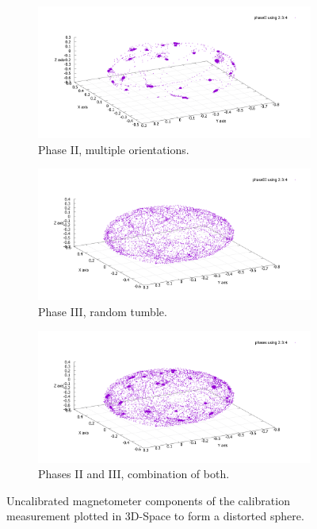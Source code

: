 \begin{figure}[h]
\begin{subfigure}[t]{.33\textwidth}
  \centering
  \includegraphics[width=.8\linewidth]{images/04_results/raw_sphere_calibration_phase_II.pdf}
  \caption{Phase II, multiple orientations.}
  \label{fig:res:raw_calibration_three_phase_II}
\end{subfigure}%
\begin{subfigure}[t]{.33\textwidth}
  \centering
  \includegraphics[width=.8\linewidth]{images/04_results/raw_sphere_calibration_phase_III.pdf}
  \caption{Phase III, random tumble.}
  \label{fig:res:raw_calibration_three_phase_III}
\end{subfigure}
\begin{subfigure}[t]{.33\textwidth}
  \centering
  \includegraphics[width=.8\linewidth]{images/04_results/raw_sphere_calibration_phases_II_III.pdf}
  \caption{Phases II and III, combination of both.}
\end{subfigure}
\caption{Uncalibrated magnetometer components of the calibration measurement plotted in 3D-Space to form a distorted sphere.}
\label{fig:res:raw_calibration_three_phases}
\end{figure}


